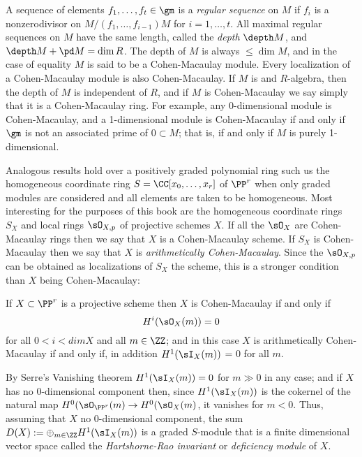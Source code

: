 A sequence of elements $f_1,\dots, f_t\in \gm$ is a \emph{regular sequence} on $M$ if $f_i$ is a nonzerodivisor on $M/(f_1, \dots, f_{i-1})M$
for $i = 1,\dots,t$. 
All maximal regular sequences on $M$ have the same length, called the \emph{depth}  $\depth M$, and 
$\depth M + \pd M = \dim R$. The depth of $M$ is always $\leq \dim M$, and in the case of equality $M$ is said to be a Cohen-Macaulay module. Every
localization of a Cohen-Macaulay module is also Cohen-Macaulay. If $M$ is and $R$-algebra, then the depth of $M$ is independent
of $R$, and if $M$ is Cohen-Macaulay we say simply that it is a Cohen-Macaulay ring. For example, any 0-dimensional module is Cohen-Macaulay,
and a 1-dimensional module is Cohen-Macaulay if and only if $\gm$ is not an associated prime of $0\subset M$; that is, if and only if $M$ is purely 1-dimensional.

Analogous results hold over a positively graded polynomial ring such us the homogeneous coordinate ring $S = \CC[x_0,\dots,x_r]$ of $\PP^r$ when
only graded modules are considered and all elements are taken to be homogeneous. Most interesting for the purposes of this book are the
homogeneous coordinate rings $S_X$ and local rings $\sO_{X,p}$ of projective schemes $X$. If all the $\sO_X$ are Cohen-Macaulay rings then we say that
$X$ is a Cohen-Macaulay scheme. If $S_X$ is Cohen-Macaulay then we say that $X$ is \emph{arithmetically Cohen-Macaulay}. Since the $\sO_{X,p}$ can be obtained as localizations of $S_X$ the scheme, this is a stronger condition than $X$ being Cohen-Macaulay:
\begin{proposition}
If $X\subset \PP^r$ is a projective scheme then $X$ is Cohen-Macaulay if and only if 
$$
H^i(\sO_X(m))= 0
$$
for all $0<i<dim X$ and all $m\in \ZZ$; and in this case
 $X$ is arithmetically Cohen-Macaulay if and only if, in addition
$H^1(\sI_X(m))$ = 0 for all $m$.
\end{proposition}

By Serre's Vanishing theorem $H^1(\sI_X(m)) = 0$ for $m\gg 0$ in any case; and if $X$ has
no 0-dimensional component then, since $H^1(\sI_X(m))$ is the cokernel of the natural map $H^0(\sO_{\PP^r}(m) \to H^0(\sO_{X}(m)$,
it vanishes for $m<0$. Thus, assuming that  $X$
no 0-dimensional component, the sum $D(X) := \oplus_{m\in \ZZ} H^1(\sI_X(m))$ is a graded $S$-module that
is a finite dimensional vector space called the \emph{Hartshorne-Rao invariant} or \emph{deficiency module} of $X$.


